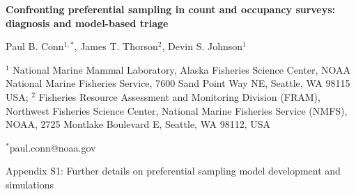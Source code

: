 \documentclass[times,mee,doublespace,]{besauth2}
\begin{document}
\begin{center} \bf {\large Confronting preferential sampling in count and occupancy surveys: diagnosis and model-based triage}

\vspace{0.7cm}
Paul B. Conn$^{1,*}$, James T. Thorson$^2$, Devin S. Johnson$^1$
\end{center}
\vspace{0.5cm}

\rm
\small


$^1$ National Marine Mammal Laboratory, Alaska Fisheries Science Center, NOAA National Marine Fisheries Service, 7600 Sand Point Way NE, Seattle, WA 98115 USA; $^2$ Fisheries Resource Assessment and Monitoring Division (FRAM), Northwest Fisheries Science Center, National Marine Fisheries Service (NMFS),
NOAA, 2725 Montlake Boulevard E, Seattle, WA 98112, USA

$^*$paul.conn@noaa.gov

\large
\bigskip
\centerline{Appendix S1: Further details on preferential sampling model development and simulations}
\bigskip
\small

\linenumbers

\def\VAR{{\rm Var}\,}
\def\COV{{\rm Cov}\,}
\def\Prob{{\rm P}\,}
\end{document}
